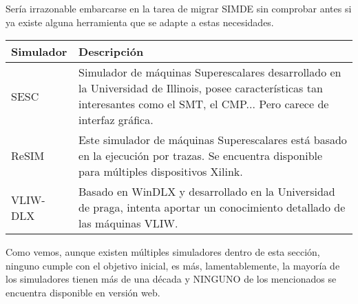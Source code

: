 Sería irrazonable embarcarse en la tarea de migrar SIMDE sin comprobar antes si ya existe alguna
herramienta que se adapte a estas necesidades.

\begin{center}
    \begin{tabular}{| l | p{12cm} |}
    \hline
    Simulador & Descripción \\ \hline
    SESC & Simulador de máquinas Superescalares desarrollado en la Universidad de Illinois, posee
    características tan interesantes como el SMT, el CMP... Pero carece de interfaz gráfica. \\ \hline
    ReSIM & Este simulador de máquinas Superescalares está basado en la ejecución por trazas. Se encuentra 
    disponible para múltiples dispositivos Xilink. \\ \hline
    VLIW-DLX & Basado en WinDLX y desarrollado en la Universidad de praga, intenta aportar un conocimiento 
    detallado de las máquinas VLIW. \\ \hline
    \end{tabular}
\end{center}

Como vemos, aunque existen múltiples simuladores dentro de esta sección, ninguno cumple con el objetivo inicial,
es más, lamentablemente, la mayoría de los simuladores tienen más de una década y NINGUNO de los mencionados se 
encuentra disponible en versión web.